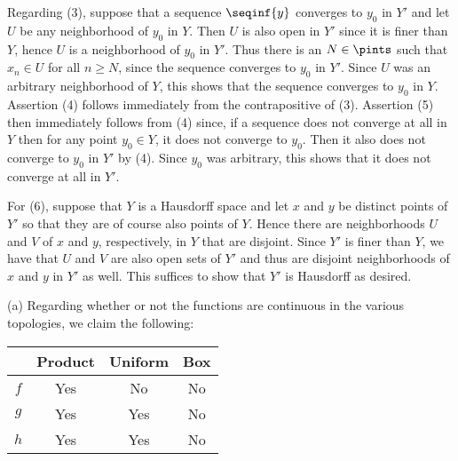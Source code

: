 {{    Regarding (3), suppose that a sequence $\seqinf{y}$ converges to $y_0$ in $Y'$ and let $U$ be any neighborhood of $y_0$ in $Y$.
    Then $U$ is also open in $Y'$ since it is finer than $Y$, hence $U$ is a neighborhood of $y_0$ in $Y'$.
    Thus there is an $N \in \pints$ such that $x_n \in U$ for all $n \geq N$, since the sequence converges to $y_0$ in $Y'$.
    Since $U$ was an arbitrary neighborhood of $Y$, this shows that the sequence converges to $y_0$ in $Y$.
    Assertion (4) follows immediately from the contrapositive of (3).
    Assertion (5) then immediately follows from (4) since, if a sequence does not converge at all in $Y$ then for any point $y_0 \in Y$, it does not converge to $y_0$.
    Then it also does not converge to $y_0$ in $Y'$ by (4).
    Since $y_0$ was arbitrary, this shows that it does not converge at all in $Y'$.

    For (6), suppose that $Y$ is a Hausdorff space and let $x$ and $y$ be distinct points of $Y'$ so that they are of course also points of $Y$.
    Hence there are neighborhoods $U$ and $V$ of $x$ and $y$, respectively, in $Y$ that are disjoint.
    Since $Y'$ is finer than $Y$, we have that $U$ and $V$ are also open sets of $Y'$ and thus are disjoint neighborhoods of $x$ and $y$ in $Y'$ as well.
    This suffices to show that $Y'$ is Hausdorff as desired.
  }

  \mainprob
  
  (a) Regarding whether or not the functions are continuous in the various topologies, we claim the following:
  \begin{center}
    \begin{tabular}{c|ccc}
      & Product & Uniform & Box \\
      \hline
      $f$ & Yes & No & No \\
      $g$ & Yes & Yes & No \\
      $h$ & Yes & Yes & No
    \end{tabular}
  \end{center}

  }
